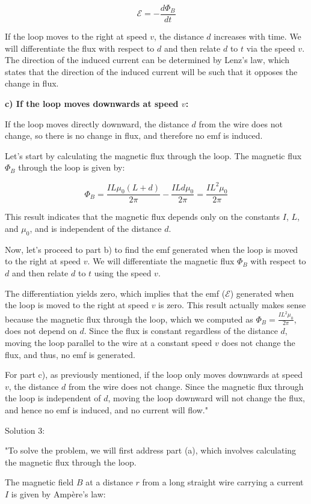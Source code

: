 \[
\mathcal{E} = - \frac{d\Phi_B}{dt}
\]

If the loop moves to the right at speed $v$, the distance $d$ increases with time. We will differentiate the flux with respect to $d$ and then relate $d$ to $t$ via the speed $v$. The direction of the induced current can be determined by Lenz's law, which states that the direction of the induced current will be such that it opposes the change in flux.

\textbf{c) If the loop moves downwards at speed $v$:}

If the loop moves directly downward, the distance $d$ from the wire does not change, so there is no change in flux, and therefore no emf is induced.

Let's start by calculating the magnetic flux through the loop. The magnetic flux $\Phi_B$ through the loop is given by:

\[
\Phi_B = \frac{I L \mu_0 (L + d)}{2 \pi} - \frac{I L d \mu_0}{2 \pi} = \frac{I L^2 \mu_0}{2 \pi}
\]

This result indicates that the magnetic flux depends only on the constants $I$, $L$, and $\mu_0$, and is independent of the distance $d$.

Now, let's proceed to part b) to find the emf generated when the loop is moved to the right at speed $v$. We will differentiate the magnetic flux $\Phi_B$ with respect to $d$ and then relate $d$ to $t$ using the speed $v$.

The differentiation yields zero, which implies that the emf ($\mathcal{E}$) generated when the loop is moved to the right at speed $v$ is zero. This result actually makes sense because the magnetic flux through the loop, which we computed as $\Phi_B = \frac{I L^2 \mu_0}{2 \pi}$, does not depend on $d$. Since the flux is constant regardless of the distance $d$, moving the loop parallel to the wire at a constant speed $v$ does not change the flux, and thus, no emf is generated.

For part c), as previously mentioned, if the loop only moves downwards at speed $v$, the distance $d$ from the wire does not change. Since the magnetic flux through the loop is independent of $d$, moving the loop downward will not change the flux, and hence no emf is induced, and no current will flow."

Solution 3: 

"To solve the problem, we will first address part (a), which involves calculating the magnetic flux through the loop.

The magnetic field \( B \) at a distance \( r \) from a long straight wire carrying a current \( I \) is given by Ampère's law:

